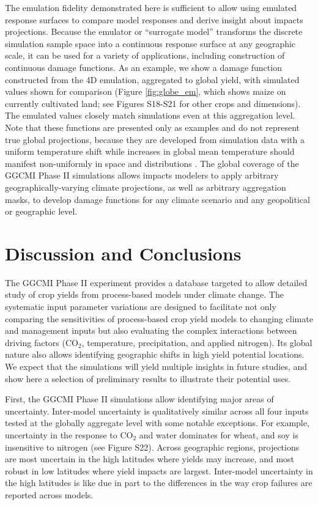 \documentclass[gmd, manuscript]{copernicus} %
\begin{document}
The emulation fidelity demonstrated here is sufficient to allow using emulated response surfaces to compare model responses and derive insight about impacts projections. Because the emulator or ``surrogate model'' transforms the discrete simulation sample space into a continuous response surface at any geographic scale, it can be used for a variety of applications, including construction of continuous damage functions. As an example, we show a damage function constructed from the 4D emulation, aggregated to global yield, with simulated values shown for comparison (Figure \ref{fig:globe_em}, which shows maize on currently cultivated land; see Figures S18-S21 for other crops and dimensions). The emulated values closely match simulations even at this aggregation level. Note that these functions are presented only as examples and do not represent true global projections, because they are developed from simulation data with a uniform temperature shift while increases in global mean temperature should manifest non-uniformly in space and distributions \citep{Sippel2015}. The global coverage of the GGCMI Phase II simulations allows impacts modelers to apply arbitrary geographically-varying climate projections, as well as arbitrary aggregation masks, to develop damage functions for any climate scenario and any geopolitical or geographic level.

\section{Discussion and Conclusions} 
\label{S:6}
The GGCMI Phase II experiment provides a database targeted to allow detailed study of crop yields from process-based models under climate change. The systematic input parameter variations are designed to facilitate not only comparing the sensitivities of process-based crop yield models to changing climate and management inputs but also evaluating the complex interactions between driving factors (CO$_2$, temperature, precipitation, and applied nitrogen). Its global nature also allows identifying geographic shifts in high yield potential locations. We expect that the simulations will yield multiple insights in future studies, and show here a selection of preliminary results to illustrate their potential uses. 

First, the GGCMI Phase II simulations allow identifying major areas of uncertainty. Inter-model uncertainty is qualitatively similar across all four inputs tested at the globally aggregate level with some notable exceptions. For example, uncertainty in the response to CO$_2$ and water dominates for wheat, and soy is insensitive to nitrogen (see Figure S22). Across geographic regions, projections are most uncertain in the high latitudes where yields may increase, and most robust in low latitudes where yield impacts are largest. Inter-model uncertainty in the high latitudes is like due in part to the differences in the way crop failures are reported across models. 
\end{document}

